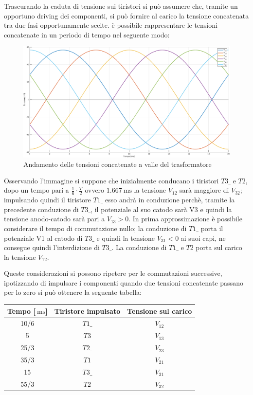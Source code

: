 \documentclass[a4paper,10pt]{article}
\begin{document}
Trascurando la caduta di tensione sui tiristori si può assumere che, tramite un
opportuno driving dei componenti, si può fornire al carico la tensione
concatenata tra due fasi opportunamente scelte.
è possibile rappresentare le tensioni concatenate in un periodo di tempo nel seguente modo:
 \begin{figure}[H]
 \centering
 \includegraphics[keepaspectratio=true,width=0.95\linewidth]
 {concatenate_carico.png}
 \caption{Andamento delle tensioni concatenate a valle del trasformatore}
 \label{fig:concatenate}
\end{figure}

Osservando l'immagine si suppone che inizialmente conducano i tiristori \(T3\_\) e \(T2\),
dopo un tempo pari a \(\frac{1}{6}\cdot \frac{T}{2}\) ovvero 
$\SI{1.667}{\milli\second}$ la tensione \(V_{12}\) sarà maggiore 
di \(V_{32}\); impulsando quindi il tiristore \(T1\_\) esso andrà in conduzione perchè, tramite la precedente conduzione di \(T3\_\), il potenziale al suo catodo sarà V3 e quindi la tensione anodo-catodo sarà pari a \(V_{13} > 0 \).
In prima approssimazione è possibile considerare il tempo di commutazione nullo;
la conduzione di \(T1\_\) porta il potenziale V1 al catodo di \(T3\_\) e 
quindi la tensione \(V_{31} < 0\) ai suoi capi, ne consegue quindi
l'interdizione di \(T3\_\).
La conduzione di \(T1\_\) e \(T2\) porta sul carico la tensione \(V_{12}\).
\smallskip

Queste considerazioni si possono ripetere per le commutazioni successive, ipotizzando
di impulsare i componenti quando due tensioni concatenate passano per lo zero si può 
ottenere la seguente tabella:

\begin{center}
\begin{tabular}{c|c|c}
  Tempo [$\SI{}{\milli\second}$]&Tiristore impulsato&Tensione sul carico\\ \hline
  10/6 & \(T1\_\) & \(V_{12}\) \\
  5    & \(T3\)   & \(V_{13}\) \\
  25/3 & \(T2\_\) & \(V_{23}\) \\
  35/3 & \(T1\)   & \(V_{21}\) \\
  15   & \(T3\_\) & \(V_{31}\) \\
  55/3 & \(T2\)   & \(V_{32}\)
\end{tabular}
\end{center}
\end{document}
